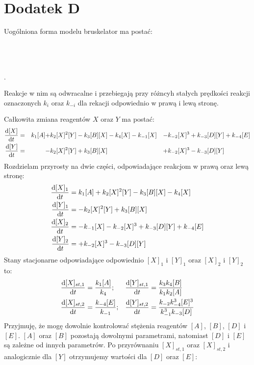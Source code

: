 \documentclass[10pt, a4paper, twoside, onecolumn]{article}
\numberwithin{equation}{section}
\begin{document}
	\section{Dodatek D}
	Uogólniona forma modelu bruskelator ma postać:
	\begin{center}
		 \\
		 \\
		 \\
		.
	\end{center}
	Reakcje w nim są odwracalne i przebiegają przy różncyh stałych prędkości reakcji oznaczonych \(k_{i}\) oraz \(k_{-i}\) dla rekacji odpowiednio w prawą i lewą stronę. \par
	Całkowita zmiana reagentów \(X\) oraz \(Y\) ma postać:
	\begin{align}
		\dv{[X]}{t} &=& k_{1}[A] +& k_{2}[X]^{2}[Y] - k_{3}[B][X] - k_{4}[X] - k_{-1}[X] &-& k_{-2}[X]^{3} + k_{-3}[D][Y] + k_{-4}[E] \\
		\dv{[Y]}{t} &=& -& k_{2}[X]^{2}[Y] + k_{3}[B][X] &+& k_{-2}[X]^{3} - k_{-3}[D][Y]
	\end{align}
	Rozdzielam przyrosty na dwie części, odpowiadające reakcjom w prawą oraz lewą stronę:
	\begin{align}
		\dv{[X]_{1}}{t} &= k_{1}[A] + k_{2}[X]^{2}[Y] - k_{3}[B][X] - k_{4}[X] \\
		\dv{[Y]_{1}}{t} &= - k_{2}[X]^{2}[Y] + k_{3}[B][X] \\
		\dv{[X]_{2}}{t} &= - k_{-1}[X] - k_{-2}[X]^{3} + k_{-3}[D][Y] + k_{-4}[E] \\
		\dv{[Y]_{2}}{t} &= + k_{-2}[X]^{3} - k_{-3}[D][Y]
	\end{align}
	Stany stacjonarne odpowiadające odpowiednio \([X]_{1}\) i \([Y]_{1}\) oraz \([X]_{2}\) i \([Y]_{2}\) to:
	\begin{align}
		\dv{[X]_{st, 1}}{t} &= \frac{k_{1}[A]}{k_{4}}; & \dv{[Y]_{st, 1}}{t} &= \frac{k_{3}k_{4}[B]}{k_{1}k_{2}[A]} \\
		\dv{[X]_{st, 2}}{t} &= \frac{k_{-4}[E]}{k_{-1}}; & \dv{[Y]_{st, 2}}{t} &= \frac{k_{-2}k_{-4}^{3}[E]^{3}}{k_{-1}^{3}k_{-3}[D]}
	\end{align}
	Przyjmuję, że mogę dowolnie kontrolować stężenia reagentów \([A]\), \([B]\), \([D]\) i \([E]\). \([A]\) oraz \([B]\) pozostają dowolnymi parametrami, natomiast \([D]\) i \([E]\) są zależne od innych parametrów. Po przyrównaniu \([X]_{st, 1}\) oraz \([X]_{st, 2}\) i analogicznie dla \([Y]\) otrzymujemy wartości dla \([D]\) oraz \([E]\):
\end{document}
